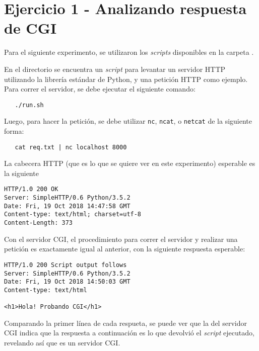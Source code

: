 






\clearpage
\tableofcontents
\clearpage 

\lstset{style=MyStyle}

\section{Ejercicio 1 - Analizando respuesta de CGI}

Para el siguiente experimento, se utilizaron los \emph{scripts} disponibles en la carpeta . 

En el directorio  se encuentra un \emph{script} para levantar un servidor HTTP utilizando la librería estándar de Python, y una petición HTTP como ejemplo. Para correr el servidor, se debe ejecutar el siguiente comando:

\begin{lstlisting}
   ./run.sh 
\end{lstlisting}

Luego, para hacer la petición, se debe utilizar \texttt{nc}, \texttt{ncat}, o \texttt{netcat} de la siguiente forma:

\begin{lstlisting}
   cat req.txt | nc localhost 8000 
\end{lstlisting}

La cabecera HTTP (que es lo que se quiere ver en este experimento) esperable es la siguiente

\begin{lstlisting}[title={Cabecera HTTP de la respuesta obtenida del servidor}]
HTTP/1.0 200 OK
Server: SimpleHTTP/0.6 Python/3.5.2
Date: Fri, 19 Oct 2018 14:47:58 GMT
Content-type: text/html; charset=utf-8
Content-Length: 373
\end{lstlisting}

Con el servidor CGI, el procedimiento para correr el servidor y realizar una petición es exactamente igual al anterior, con la siguiente respuesta esperable:

\begin{lstlisting}[title={Respuesta obtenida del servidor CGI}]
HTTP/1.0 200 Script output follows
Server: SimpleHTTP/0.6 Python/3.5.2
Date: Fri, 19 Oct 2018 14:50:03 GMT
Content-type: text/html

<h1>Hola! Probando CGI</h1>
\end{lstlisting}

Comparando la primer línea de cada respueta, se puede ver que la del servidor CGI indica que la respuesta a continuación es lo que devolvió el \emph{script} ejecutado, revelando así que es un servidor CGI.



\clearpage
\printbibliography


